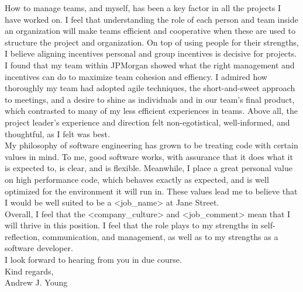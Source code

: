 \documentclass{article}
\begin{document}
How to manage teams, and myself, has been a key factor in all the projects I
have worked on. I feel that understanding the role of each person and team
inside an organization will make teams efficient and cooperative when these are
used to structure the project and organization. On top of using people for
their strengths, I believe aligning incentives personal and group incentives is
decisive for projects. I found that my team within JPMorgan showed what the
right management and incentives can do to maximize team cohesion and effiency.
I admired how thoroughly my team had adopted agile techniques, the
short-and-sweet approach to meetings, and a desire to shine as individuals and
in our team's final product, which contrasted to many of my less efficient
experiences in teams. Above all, the project leader's experience and direction
felt non-egotistical, well-informed, and thoughtful, as I felt was best.\\

My philosophy of software engineering has grown to be treating code with
certain values in mind. To me, good software works, with assurance that it does
what it is expected to, is clear, and is flexible. Meanwhile, I place a great
personal value on high performance code, which behaves exactly as expected, and
is well optimized for the environment it will run in. These values lead me to
believe that I would be well suited to be a <job\_name> at Jane Street.\\

Overall, I feel that the <company\_culture> and <job\_comment> mean that I will
thrive in this position. I feel that the role plays to my strengths in self-
reflection, communication, and management, as well as to my strengths as a
software developer.\\

I look forward to hearing from you in due course.\\

Kind regards,\\

Andrew J. Young\\
\end{document}
